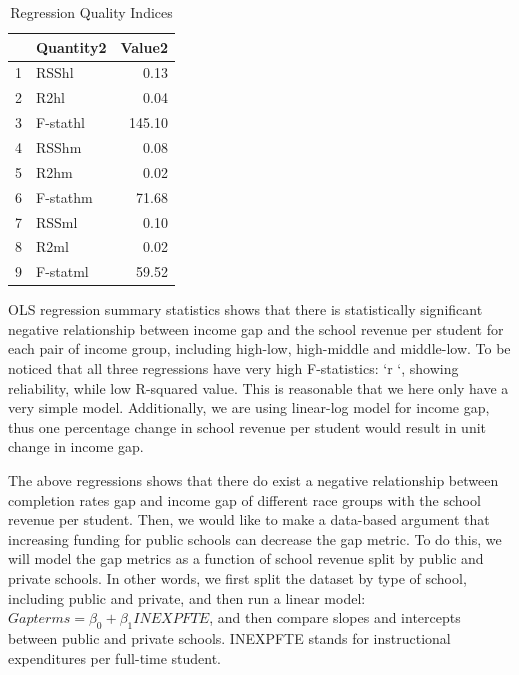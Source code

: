 \documentclass{article}
\begin{document}
\begin{table}[ht]
\centering
\caption{Regression Quality Indices} 
\begin{tabular}{rlr}
  \hline
 & Quantity2 & Value2 \\ 
  \hline
1 & RSShl & 0.13 \\ 
  2 & R2hl & 0.04 \\ 
  3 & F-stathl & 145.10 \\ 
  4 & RSShm & 0.08 \\ 
  5 & R2hm & 0.02 \\ 
  6 & F-stathm & 71.68 \\ 
  7 & RSSml & 0.10 \\ 
  8 & R2ml & 0.02 \\ 
  9 & F-statml & 59.52 \\ 
   \hline
\end{tabular}
\end{table}
OLS regression summary statistics shows that there is statistically significant negative relationship between income gap and the school revenue per student for each pair of income group, including high-low, high-middle and middle-low. To be noticed that all three regressions have very high F-statistics: `r `, showing reliability, while low R-squared value. This is reasonable that we here only have a very simple model. Additionally, we are using linear-log model for income gap, thus one percentage change in school revenue per student would result in unit change in income gap. 


The above regressions shows that there do exist a negative relationship between completion rates gap and income gap of different race groups with the school revenue per student. Then, we would like to make a data-based argument that increasing funding for public schools can decrease the gap metric. To do this, we will model the gap metrics as a function of school revenue split by public and private schools. In other words, we first split the dataset by type of school, including public and private, and then run a linear model: $Gapterms= \beta_0 + \beta_1 INEXPFTE$, and then compare slopes and intercepts between public and private schools. INEXPFTE stands for  instructional expenditures per full-time student. 
\end{document}
